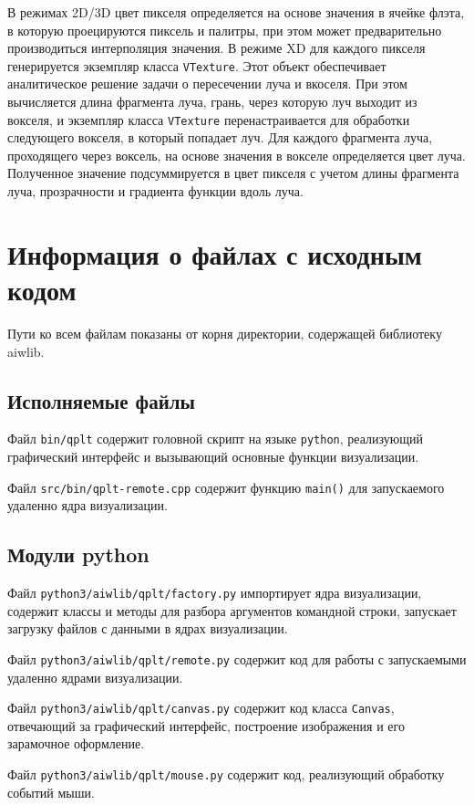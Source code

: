 \documentclass[12pt]{article}
\begin{document}
В режимах 2D/3D цвет пикселя определяется на основе значения в ячейке флэта, в которую проецируются пиксель и палитры,
при этом может предварительно производиться интерполяция значения. В режиме XD для каждого пикселя генерируется экземпляр
класса \verb'VTexture'. Этот объект обеспечивает аналитическое решение задачи о пересечении луча и вкоселя. При этом вычисляется длина фрагмента луча,
грань, через которую луч выходит из вокселя, и экземпляр класса \verb'VTexture' перенастраивается для обработки следующего вокселя, в который попадает луч.
Для каждого фрагмента луча, проходящего через воксель, на основе значения в вокселе определяется цвет луча. Полученное значение подсуммируется 
в цвет пикселя с учетом длины фрагмента луча, прозрачности и градиента функции вдоль луча. 


\section{Информация о файлах с исходным кодом}   %
Пути ко всем файлам показаны от корня директории, содержащей библиотеку aiwlib.
\subsection{Исполняемые файлы}
Файл \verb'bin/qplt' содержит головной скрипт на языке \verb'python', реализующий графический интерфейс и вызывающий основные функции визуализации.

Файл \verb'src/bin/qplt-remote.cpp' содержит функцию \verb'main()' для запускаемого удаленно ядра визуализации.

\subsection{Модули python}
Файл \verb'python3/aiwlib/qplt/factory.py' импортирует ядра визуализации, содержит классы и методы для разбора аргументов командной строки,
запускает загрузку файлов с данными в ядрах визуализации.

Файл \verb'python3/aiwlib/qplt/remote.py' содержит код для работы с запускаемыми удаленно ядрами визуализации.

Файл \verb'python3/aiwlib/qplt/canvas.py' содержит код класса \verb'Canvas', отвечающий за графический интерфейс, построение изображения и его
зарамочное оформление.

Файл \verb'python3/aiwlib/qplt/mouse.py' содержит код, реализующий обработку событий мыши.
\end{document}
